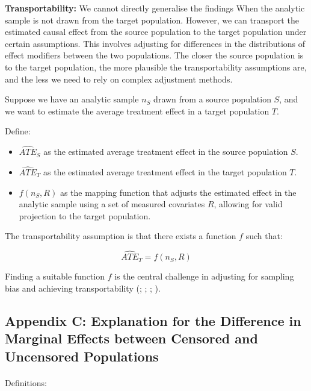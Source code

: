 \documentclass[
  single column]{article}
\makeatletter
\let\oldparagraph\paragraph
\renewcommand{\paragraph}{
    \@ifstar
      \xxxParagraphStar
      \xxxParagraphNoStar
  }
\newcommand{\xxxParagraphStar}[1]{\oldparagraph*{#1}\mbox{}}
\newcommand{\xxxParagraphNoStar}[1]{\oldparagraph{#1}\mbox{}}
\providecommand{\tightlist}{%
  \setlength{\itemsep}{0pt}\setlength{\parskip}{0pt}}\usepackage{longtable,booktabs,array}
\makeatother
\begin{document}
\textbf{Transportability:} We cannot directly generalise the findings
When the analytic sample is not drawn from the target population.
However, we can transport the estimated causal effect from the source
population to the target population under certain assumptions. This
involves adjusting for differences in the distributions of effect
modifiers between the two populations. The closer the source population
is to the target population, the more plausible the transportability
assumptions are, and the less we need to rely on complex adjustment
methods.

Suppose we have an analytic sample \(n_S\) drawn from a source
population \(S\), and we want to estimate the average treatment effect
in a target population \(T\).

Define:

\begin{itemize}
\tightlist
\item
  \(\widehat{ATE}_{S}\) as the estimated average treatment effect in the
  source population \(S\).
\item
  \(\widehat{ATE}_{T}\) as the estimated average treatment effect in the
  target population \(T\).
\item
  \(f(n_S, R)\) as the mapping function that adjusts the estimated
  effect in the analytic sample using a set of measured covariates
  \(R\), allowing for valid projection to the target population.
\end{itemize}

The transportability assumption is that there exists a function \(f\)
such that:

\[
\widehat{ATE}_{T} = f(n_S, R)
\]

Finding a suitable function \(f\) is the central challenge in adjusting
for sampling bias and achieving transportability
(;
;
;
).

\newpage{}

\subsection{Appendix C: Explanation for the Difference in Marginal
Effects between Censored and Uncensored Populations}\label{id-app-c}

\paragraph{Definitions:}\label{definitions}
\end{document}
